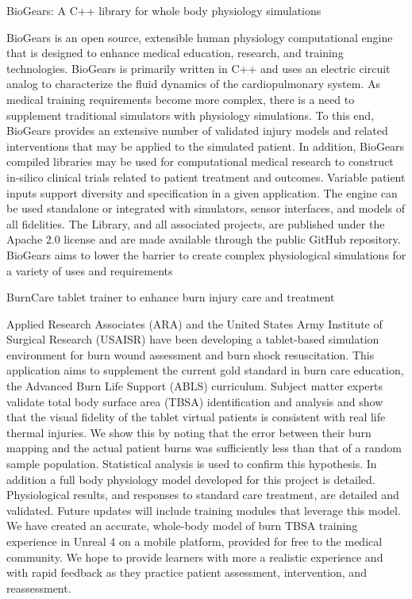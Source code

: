   \cventry
    {BioGears: A C++ library for whole body physiology simulations} %
    {} %
    {} %
    {} %
     {
    \begin{cvitems} %
    \item {BioGears is an open source, extensible human physiology computational engine that is designed to enhance medical education, research, and training technologies. BioGears is primarily written in C++ and uses an electric circuit analog to characterize the fluid dynamics of the cardiopulmonary system. As medical training requirements become more complex, there is a need to supplement traditional simulators with physiology simulations. To this end, BioGears provides an extensive number of validated injury models and related interventions that may be applied to the simulated patient. In addition, BioGears compiled libraries may be used for computational medical research to construct in-silico clinical trials related to patient treatment and outcomes. Variable patient inputs support diversity and specification in a given application. The engine can be used standalone or integrated with simulators, sensor interfaces, and models of all fidelities. The Library, and all associated projects, are published under the Apache 2.0 license and are made available through the public GitHub repository. BioGears aims to lower the barrier to create complex physiological simulations for a variety of uses and requirements}
    \end{cvitems}
     }

  \cventry
    {BurnCare tablet trainer to enhance burn injury care and treatment} %
    {} %
    {} %
    {} %
     {
    \begin{cvitems} %
    \item {Applied Research Associates (ARA) and the United States Army Institute of Surgical Research (USAISR) have been developing a tablet-based simulation environment for burn wound assessment and burn shock resuscitation. This application aims to supplement the current gold standard in burn care education, the Advanced Burn Life Support (ABLS) curriculum. Subject matter experts validate total body surface area (TBSA) identification and analysis and show that the visual fidelity of the tablet virtual patients is consistent with real life thermal injuries. We show this by noting that the error between their burn mapping and the actual patient burns was sufficiently less than that of a random sample population. Statistical analysis is used to confirm this hypothesis. In addition a full body physiology model developed for this project is detailed. Physiological results, and responses to standard care treatment, are detailed and validated. Future updates will include training modules that leverage this model. We have created an accurate, whole-body model of burn TBSA training experience in Unreal 4 on a mobile platform, provided for free to the medical community. We hope to provide learners with more a realistic experience and with rapid feedback as they practice patient assessment, intervention, and reassessment.}
    \end{cvitems}
     }

